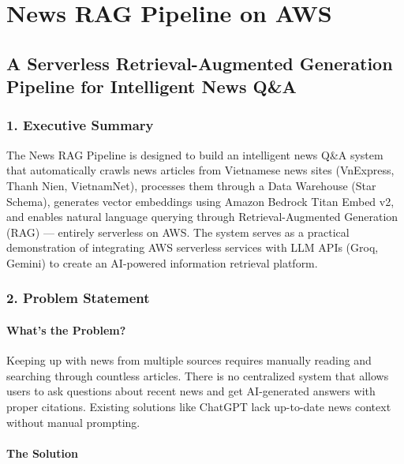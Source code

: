 \hypertarget{news-rag-pipeline-on-aws}{%
\section{News RAG Pipeline on AWS}}

\hypertarget{a-serverless-retrieval-augmented-generation-pipeline-for-intelligent-news-qa}{%
\subsection{A Serverless Retrieval-Augmented Generation Pipeline for
Intelligent News
Q\&A}}

\hypertarget{executive-summary}{%
\subsubsection{1. Executive Summary}}

The News RAG Pipeline is designed to build an intelligent news Q\&A
system that automatically crawls news articles from Vietnamese news
sites (VnExpress, Thanh Nien, VietnamNet), processes them through a Data
Warehouse (Star Schema), generates vector embeddings using Amazon
Bedrock Titan Embed v2, and enables natural language querying through
Retrieval-Augmented Generation (RAG) --- entirely serverless on AWS. The
system serves as a practical demonstration of integrating AWS serverless
services with LLM APIs (Groq, Gemini) to create an AI-powered
information retrieval platform.

\hypertarget{problem-statement}{%
\subsubsection{2. Problem Statement}}

\hypertarget{whats-the-problem}{%
\paragraph{What's the Problem?}}

Keeping up with news from multiple sources requires manually reading and
searching through countless articles. There is no centralized system
that allows users to ask questions about recent news and get
AI-generated answers with proper citations. Existing solutions like
ChatGPT lack up-to-date news context without manual prompting.

\hypertarget{the-solution}{%
\paragraph{The Solution}}

